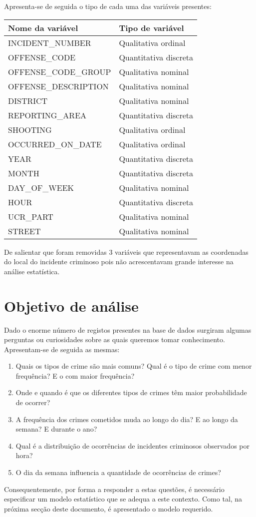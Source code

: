 \documentclass[a4paper]{report}
\begin{document}
{	Apresenta-se de seguida o tipo de cada uma das variáveis presentes:
	\begin{center}
		\begin{tabular}{ | l | l | }
		\hline
		\textbf{Nome da variável} & \textbf{Tipo de variável} \\ \hline
		INCIDENT\_NUMBER & Qualitativa ordinal \\ \hline
		OFFENSE\_CODE & Quantitativa discreta \\ \hline
		OFFENSE\_CODE\_GROUP & Qualitativa nominal \\ \hline
		OFFENSE\_DESCRIPTION & Qualitativa nominal \\ \hline
		DISTRICT & Qualitativa nominal \\ \hline
		REPORTING\_AREA & Quantitativa discreta \\ \hline
		SHOOTING & Qualitativa ordinal \\ \hline
		OCCURRED\_ON\_DATE & Qualitativa ordinal \\ \hline
		YEAR & Quantitativa discreta \\ \hline
		MONTH & Quantitativa discreta \\ \hline
		DAY\_OF\_WEEK & Qualitativa nominal \\ \hline
		HOUR & Quantitativa discreta \\ \hline
		UCR\_PART & Qualitativa nominal \\ \hline
		STREET & Qualitativa nominal \\ \hline
		\end{tabular}
	\end{center}
	
	De salientar que foram removidas 3 variáveis que representavam as coordenadas do local do incidente criminoso pois não acrescentavam grande interesse na análise estatística. 
	
	\section{Objetivo de análise}
	Dado o enorme número de registos presentes na base de dados surgiram algumas perguntas ou curiosidades sobre as quais queremos tomar conhecimento. Apresentam-se de seguida as mesmas:
	\begin{enumerate}
	    \item Quais os tipos de crime são mais comuns? Qual é o tipo de crime com menor frequência? E o com maior frequência?
	    \item Onde e quando é que os diferentes tipos de crimes têm maior probabilidade de ocorrer?
	    \item A frequência dos crimes cometidos muda ao longo do dia? E ao longo da semana? E durante o ano?
	    \item Qual é a distribuição de ocorrências de incidentes criminosos observados por hora?
	    \item O dia da semana influencia a quantidade de ocorrências de crimes?
	\end{enumerate}
	
	Consequentemente, por forma a responder a estas questões, é necessário especificar um modelo estatístico que se adequa a este contexto. Como tal, na próxima secção deste documento, 
	é apresentado o modelo requerido.
}
\end{document}
